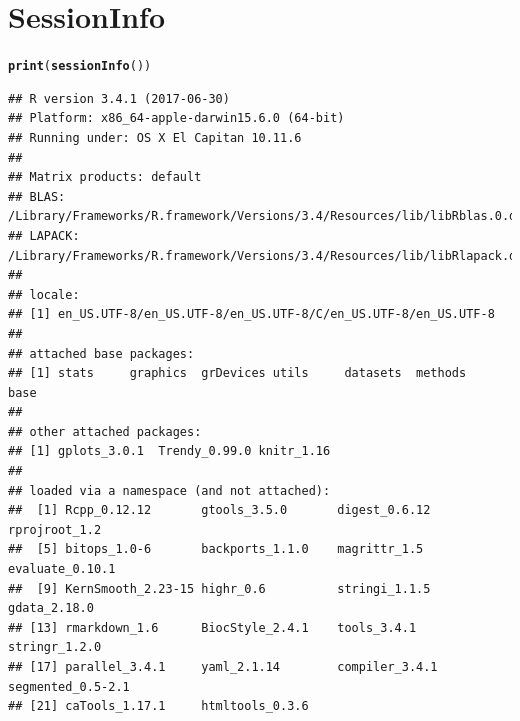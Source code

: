 \documentclass{article}\usepackage[]{graphicx}\usepackage[usenames,dvipsnames]{color}
\makeatletter
\newcommand{\hlstd}[1]{\textcolor[rgb]{0.345,0.345,0.345}{#1}}%
\newcommand{\hlkwd}[1]{\textcolor[rgb]{0.737,0.353,0.396}{\textbf{#1}}}%
\newenvironment{kframe}{%
 \def\at@end@of@kframe{}%
 \ifinner\ifhmode%
  \def\at@end@of@kframe{\end{minipage}}%
  \begin{minipage}{\columnwidth}%
 \fi\fi%
 \def\FrameCommand##1{\hskip\@totalleftmargin \hskip-\fboxsep
 \colorbox{shadecolor}{##1}\hskip-\fboxsep
     \hskip-\linewidth \hskip-\@totalleftmargin \hskip\columnwidth}%
 \MakeFramed {\advance\hsize-\width
   \@totalleftmargin\z@ \linewidth\hsize
   \@setminipage}}%
 {\par\unskip\endMakeFramed%
 \at@end@of@kframe}
\newenvironment{knitrout}{}{} %
\makeatother
\begin{document}
\newpage
\section{SessionInfo}
\begin{knitrout}
\color{fgcolor}\begin{kframe}
\begin{alltt}
\hlkwd{print}\hlstd{(}\hlkwd{sessionInfo}\hlstd{())}
\end{alltt}
\begin{verbatim}
## R version 3.4.1 (2017-06-30)
## Platform: x86_64-apple-darwin15.6.0 (64-bit)
## Running under: OS X El Capitan 10.11.6
## 
## Matrix products: default
## BLAS: /Library/Frameworks/R.framework/Versions/3.4/Resources/lib/libRblas.0.dylib
## LAPACK: /Library/Frameworks/R.framework/Versions/3.4/Resources/lib/libRlapack.dylib
## 
## locale:
## [1] en_US.UTF-8/en_US.UTF-8/en_US.UTF-8/C/en_US.UTF-8/en_US.UTF-8
## 
## attached base packages:
## [1] stats     graphics  grDevices utils     datasets  methods   base     
## 
## other attached packages:
## [1] gplots_3.0.1  Trendy_0.99.0 knitr_1.16   
## 
## loaded via a namespace (and not attached):
##  [1] Rcpp_0.12.12       gtools_3.5.0       digest_0.6.12      rprojroot_1.2     
##  [5] bitops_1.0-6       backports_1.1.0    magrittr_1.5       evaluate_0.10.1   
##  [9] KernSmooth_2.23-15 highr_0.6          stringi_1.1.5      gdata_2.18.0      
## [13] rmarkdown_1.6      BiocStyle_2.4.1    tools_3.4.1        stringr_1.2.0     
## [17] parallel_3.4.1     yaml_2.1.14        compiler_3.4.1     segmented_0.5-2.1 
## [21] caTools_1.17.1     htmltools_0.3.6
\end{verbatim}
\end{kframe}
\end{knitrout}
\end{document}
